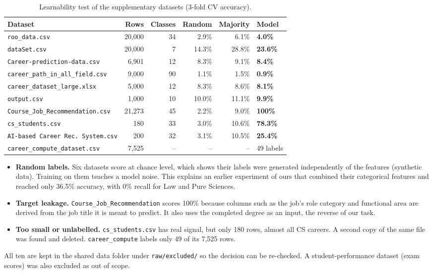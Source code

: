 \documentclass[11pt,a4paper]{article}
\begin{document}
\begin{table}[H]
\centering\small
\caption{Learnability test of the supplementary datasets (3-fold CV accuracy).}
\label{tab:excluded}
\begin{tabular}{@{}lrrrrl@{}}
\toprule
Dataset & Rows & Classes & Random & Majority & \textbf{Model} \\
\midrule
\texttt{roo\_data.csv} & 20,000 & 34 & 2.9\% & 6.1\% & \textbf{4.0\%} \\
\texttt{dataSet.csv} & 20,000 & 7 & 14.3\% & 28.8\% & \textbf{23.6\%} \\
\texttt{Career-prediction-data.csv} & 6,901 & 12 & 8.3\% & 9.1\% & \textbf{8.4\%} \\
\texttt{career\_path\_in\_all\_field.csv} & 9,000 & 90 & 1.1\% & 1.5\% & \textbf{0.9\%} \\
\texttt{career\_dataset\_large.xlsx} & 5,000 & 12 & 8.3\% & 8.6\% & \textbf{8.1\%} \\
\texttt{output.csv} & 1,000 & 10 & 10.0\% & 11.1\% & \textbf{9.9\%} \\
\texttt{Course\_Job\_Recommendation.csv} & 21,273 & 45 & 2.2\% & 9.0\% & \textbf{100\%} \\
\texttt{cs\_students.csv} & 180 & 33 & 3.0\% & 10.6\% & \textbf{78.3\%} \\
\texttt{AI-based Career Rec.\ System.csv} & 200 & 32 & 3.1\% & 10.5\% & \textbf{25.4\%} \\
\texttt{career\_compute\_dataset.csv} & 7,525 & -- & -- & -- & 49 labels \\
\bottomrule
\end{tabular}
\end{table}

\begin{itemize}
\item \textbf{Random labels.} Six datasets score at chance level, which shows their labels were
      generated independently of the features (synthetic data). Training on them teaches a model
      noise. This explains an earlier experiment of ours that combined their categorical features
      and reached only 36.5\% accuracy, with 0\% recall for Law and Pure Sciences.
\item \textbf{Target leakage.} \texttt{Course\_Job\_Recommendation} scores 100\% because columns
      such as the job's role category and functional area are derived from the job title it is
      meant to predict. It also uses the completed degree as an input, the reverse of our task.
\item \textbf{Too small or unlabelled.} \texttt{cs\_students.csv} has real signal, but only 180
      rows, almost all CS careers. A second copy of the same file was found and deleted.
      \texttt{career\_compute} labels only 49 of its 7,525 rows.
\end{itemize}
All ten are kept in the shared data folder under \texttt{raw/excluded/} so the decision can be
re-checked. A student-performance dataset (exam scores) was also excluded as out of scope.
\end{document}
